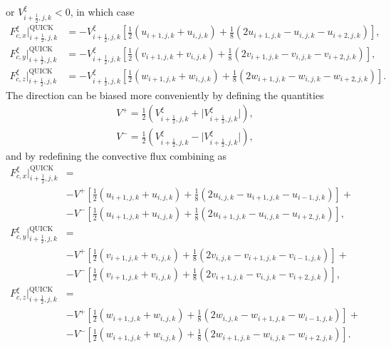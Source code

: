 or $V^\xi_{i+\frac{1}{2},j,k}<0$, in which case 
\begin{align}
	F^\xi_{c,x}\bigg|^\text{QUICK}_{i+\frac{1}{2},j,k} &= -V^\xi_{i+\frac{1}{2},j,k} \left[\frac{1}{2}\left(u_{i+1,j,k}+u_{i,j,k}\right) + \frac{1}{8}\left(2u_{i+1,j,k}-u_{i,j,k}-u_{i+2,j,k}\right)\right], \nonumber \\
	F^\xi_{c,y}\bigg|^\text{QUICK}_{i+\frac{1}{2},j,k} &= -V^\xi_{i+\frac{1}{2},j,k} \left[\frac{1}{2}\left(v_{i+1,j,k}+v_{i,j,k}\right) + \frac{1}{8}\left(2v_{i+1,j,k}-v_{i,j,k}-v_{i+2,j,k}\right)\right], \nonumber \\
	F^\xi_{c,z}\bigg|^\text{QUICK}_{i+\frac{1}{2},j,k} &= -V^\xi_{i+\frac{1}{2},j,k} \left[\frac{1}{2}\left(w_{i+1,j,k}+w_{i,j,k}\right) + \frac{1}{8}\left(2w_{i+1,j,k}-w_{i,j,k}-w_{i+2,j,k}\right)\right]. \label{eq:quickFluxes2}
\end{align} 
The direction can be biased more conveniently by defining the quantities 
\begin{align}
	V^+ = \frac{1}{2}\left(V^\xi_{i+\frac{1}{2},j,k} + \big|V^\xi_{i+\frac{1}{2},j,k}\big|\right), \nonumber \\
	V^- = \frac{1}{2}\left(V^\xi_{i+\frac{1}{2},j,k} - \big|V^\xi_{i+\frac{1}{2},j,k}\big|\right),
\end{align}
and by redefining the convective flux combining  as
\begin{align}
	F^\xi_{c,x}\bigg|^\text{QUICK}_{i+\frac{1}{2},j,k} &= \nonumber \\
	&-V^+\left[\frac{1}{2}\left(u_{i+1,j,k}+u_{i,j,k}\right) + \frac{1}{8}\left(2u_{i,j,k}-u_{i+1,j,k}-u_{i-1,j,k}\right)\right] + \nonumber \\
	&-V^-\left[\frac{1}{2}\left(u_{i+1,j,k}+u_{i,j,k}\right) + \frac{1}{8}\left(2u_{i+1,j,k}-u_{i,j,k}-u_{i+2,j,k}\right)\right], \nonumber \\
	F^\xi_{c,y}\bigg|^\text{QUICK}_{i+\frac{1}{2},j,k} &= \nonumber \\
	&-V^+\left[\frac{1}{2}\left(v_{i+1,j,k}+v_{i,j,k}\right) + \frac{1}{8}\left(2v_{i,j,k}-v_{i+1,j,k}-v_{i-1,j,k}\right)\right] + \nonumber \\
	&-V^-\left[\frac{1}{2}\left(v_{i+1,j,k}+v_{i,j,k}\right) + \frac{1}{8}\left(2v_{i+1,j,k}-v_{i,j,k}-v_{i+2,j,k}\right)\right], \nonumber \\
	F^\xi_{c,z}\bigg|^\text{QUICK}_{i+\frac{1}{2},j,k} &= \nonumber \\
	&-V^+\left[\frac{1}{2}\left(w_{i+1,j,k}+w_{i,j,k}\right) + \frac{1}{8}\left(2w_{i,j,k}-w_{i+1,j,k}-w_{i-1,j,k}\right)\right] + \nonumber \\
	&-V^-\left[\frac{1}{2}\left(w_{i+1,j,k}+w_{i,j,k}\right) + \frac{1}{8}\left(2w_{i+1,j,k}-w_{i,j,k}-w_{i+2,j,k}\right)\right]. \label{eq:quickFluxes3} 
\end{align}
